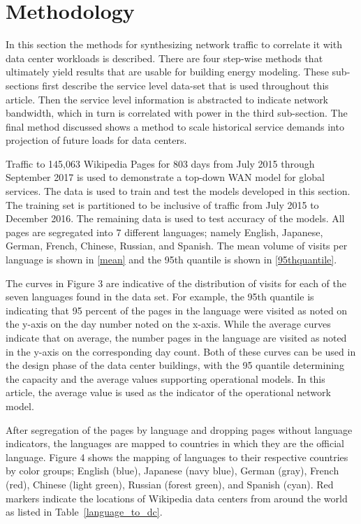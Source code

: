\section{Methodology} 
    In this section the methods for synthesizing network traffic to correlate it with data center workloads is described. There are four step-wise methods that ultimately yield results that are usable for building energy modeling. These sub-sections first describe the service level data-set that is used throughout this article. Then the service level information is abstracted to indicate network bandwidth, which in turn is correlated with power in the third sub-section. The final method discussed shows a method to scale historical service demands into projection of future loads for data centers.  
    
    

    Traffic to 145,063 Wikipedia Pages for 803 days from July 2015 through September 2017 is used to demonstrate a top-down WAN model for global services. The data is used to train and test the models developed in this section. The training set is partitioned to be inclusive of traffic from July 2015 to December 2016. The remaining data is used to test accuracy of the models. All pages are segregated into 7 different languages; namely English, Japanese, German, French, Chinese, Russian, and Spanish. The mean volume of visits per language is shown in \ref{mean} and the 95th quantile is shown in \ref{95thquantile}.  
    
    The curves in Figure 3 are indicative of the distribution of visits for each of the seven languages found in the data set.  For example, the 95th quantile is indicating that 95 percent of the pages in the language were visited as noted on the y-axis on the day number noted on the x-axis. While the average curves indicate that on average, the number pages in the language are visited as noted in the y-axis on the corresponding day count. Both of these curves can be used in the design phase of the data center buildings, with the 95 quantile determining the capacity and the average values supporting operational models. In this article, the average value is used as the indicator of the operational network model. 
    
    
    
    After segregation of the pages by language and dropping pages without language indicators, the languages are mapped to countries in which they are the official language. Figure 4 shows the mapping of languages to their respective countries by color groups; English (blue), Japanese (navy blue), German (gray), French (red), Chinese (light green), Russian (forest green), and Spanish (cyan). Red markers indicate the locations of Wikipedia data centers from around the world as listed in Table~\ref{language_to_dc}.
    
